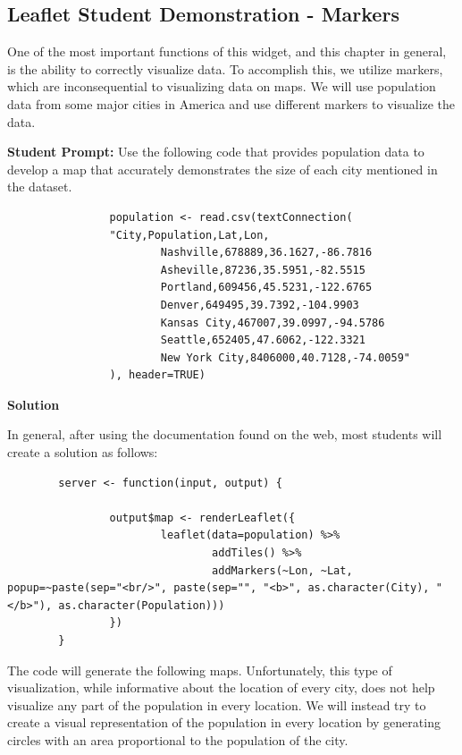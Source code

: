	\subsection{Leaflet Student Demonstration - Markers}
	
	One of the most important functions of this widget, and this chapter in general, is the ability to correctly visualize data.
        To accomplish this, we utilize markers, which are inconsequential to visualizing data on maps.
        We will use population data from some major cities in America and use different markers to visualize the data.
	
	\noindent\textbf{Student Prompt: } Use the following code that provides population data to develop a map that accurately demonstrates the size of each city mentioned in the dataset.
		
        \begin{lstlisting}
                population <- read.csv(textConnection(
                "City,Population,Lat,Lon,
                        Nashville,678889,36.1627,-86.7816
                        Asheville,87236,35.5951,-82.5515
                        Portland,609456,45.5231,-122.6765
                        Denver,649495,39.7392,-104.9903
                        Kansas City,467007,39.0997,-94.5786
                        Seattle,652405,47.6062,-122.3321
                        New York City,8406000,40.7128,-74.0059"
                ), header=TRUE)
        \end{lstlisting}

	\noindent\textbf{Solution}
	
	In general, after using the documentation found on the web, most students will create a solution as follows:

        \begin{lstlisting}
        server <- function(input, output) {
                
                output$map <- renderLeaflet({
                        leaflet(data=population) %>%
                                addTiles() %>%
                                addMarkers(~Lon, ~Lat, popup=~paste(sep="<br/>", paste(sep="", "<b>", as.character(City), "</b>"), as.character(Population)))
                })
        }
        \end{lstlisting}

	The code will generate the following maps.
        Unfortunately, this type of visualization, while informative about the location of every city, does not help visualize any part of the population in every location.
        We will instead try to create a visual representation of the population in every location by generating circles with an area proportional to the population of the city.
	
